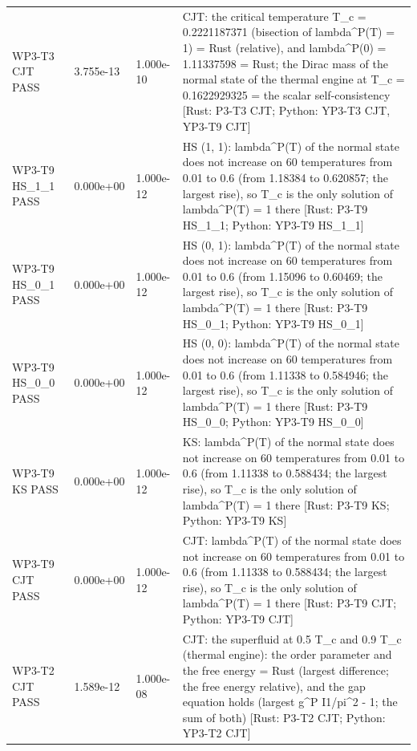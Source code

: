 \documentclass[aps,prd,onecolumn,superscriptaddress,nofootinbib,floatfix,longbibliography]{revtex4-2}
\begin{document}
\begin{longtable}{p{}p{}p{}p{}}
WP3-T3 CJT \newline PASS & 3.755e-13 & 1.000e-10 & CJT: the critical temperature T\_c = 0.2221187371 (bisection of lambda\textasciicircum{}P(T) = 1) = Rust (relative), and lambda\textasciicircum{}P(0) = 1.11337598 = Rust; the Dirac mass of the normal state of the thermal engine at T\_c = 0.1622929325 = the scalar self-consistency [Rust: P3-T3 CJT; Python: YP3-T3 CJT, YP3-T9 CJT] \\
WP3-T9 HS\_1\_1 \newline PASS & 0.000e+00 & 1.000e-12 & HS (1, 1): lambda\textasciicircum{}P(T) of the normal state does not increase on 60 temperatures from 0.01 to 0.6 (from 1.18384 to 0.620857; the largest rise), so T\_c is the only solution of lambda\textasciicircum{}P(T) = 1 there [Rust: P3-T9 HS\_1\_1; Python: YP3-T9 HS\_1\_1] \\
WP3-T9 HS\_0\_1 \newline PASS & 0.000e+00 & 1.000e-12 & HS (0, 1): lambda\textasciicircum{}P(T) of the normal state does not increase on 60 temperatures from 0.01 to 0.6 (from 1.15096 to 0.60469; the largest rise), so T\_c is the only solution of lambda\textasciicircum{}P(T) = 1 there [Rust: P3-T9 HS\_0\_1; Python: YP3-T9 HS\_0\_1] \\
WP3-T9 HS\_0\_0 \newline PASS & 0.000e+00 & 1.000e-12 & HS (0, 0): lambda\textasciicircum{}P(T) of the normal state does not increase on 60 temperatures from 0.01 to 0.6 (from 1.11338 to 0.584946; the largest rise), so T\_c is the only solution of lambda\textasciicircum{}P(T) = 1 there [Rust: P3-T9 HS\_0\_0; Python: YP3-T9 HS\_0\_0] \\
WP3-T9 KS \newline PASS & 0.000e+00 & 1.000e-12 & KS: lambda\textasciicircum{}P(T) of the normal state does not increase on 60 temperatures from 0.01 to 0.6 (from 1.11338 to 0.588434; the largest rise), so T\_c is the only solution of lambda\textasciicircum{}P(T) = 1 there [Rust: P3-T9 KS; Python: YP3-T9 KS] \\
WP3-T9 CJT \newline PASS & 0.000e+00 & 1.000e-12 & CJT: lambda\textasciicircum{}P(T) of the normal state does not increase on 60 temperatures from 0.01 to 0.6 (from 1.11338 to 0.588434; the largest rise), so T\_c is the only solution of lambda\textasciicircum{}P(T) = 1 there [Rust: P3-T9 CJT; Python: YP3-T9 CJT] \\
WP3-T2 CJT \newline PASS & 1.589e-12 & 1.000e-08 & CJT: the superfluid at 0.5 T\_c and 0.9 T\_c (thermal engine): the order parameter and the free energy = Rust (largest difference; the free energy relative), and the gap equation holds (largest \textbar{}g\textasciicircum{}P I1/pi\textasciicircum{}2 - 1\textbar{}; the sum of both) [Rust: P3-T2 CJT; Python: YP3-T2 CJT] \\

\end{longtable}
\end{document}
